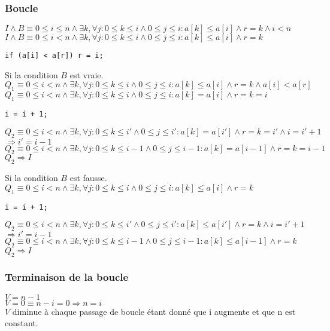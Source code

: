 \documentclass[11pt]{article}
\begin{document}
\subsubsection{Boucle}
$I \land B \equiv 0 \leq i \leq n \land 
	\exists k, \forall j : 0 \leq k \leq i \land 0 \leq j \leq i : a[k] \leq a[i] \land
	r = k \land
	i < n
$\\
$I \land B \equiv 0 \leq i < n \land 
	\exists k, \forall j : 0 \leq k \leq i \land 0 \leq j \leq i : a[k] \leq a[i] \land
	r = k
$
\begin{lstlisting}[style=CStyle]
if (a[i] < a[r]) r = i;
\end{lstlisting}

Si la condition $B$ est vraie.\\
$Q_1 \equiv 0 \leq i < n \land \exists k, \forall j : 0 \leq k \leq i \land 0 \leq j \leq i : a[k] \leq a[i] \land r = k \land a[i] < a[r]$\\
$Q_1 \equiv 0 \leq i < n \land \exists k, \forall j : 0 \leq k \leq i \land 0 \leq j \leq i : a[k] = a[i] \land r = k = i$
\begin{lstlisting}[style=CStyle]
i = i + 1;
\end{lstlisting}
$Q_2 \equiv 0 \leq i < n \land \exists k, \forall j : 0 \leq k \leq i' \land 0 \leq j \leq i' : a[k] = a[i'] \land r = k = i' \land i = i' + 1$\\
$\Rightarrow i' = i - 1$\\
$Q_2 \equiv 0 \leq i < n \land \exists k, \forall j : 0 \leq k \leq i - 1 \land 0 \leq j \leq i - 1 : a[k] = a[i - 1] \land r = k = i - 1$\\
$Q_2 \Rightarrow I$

Si la condition $B$ est fausse.\\
$Q_1 \equiv 0 \leq i < n \land \exists k, \forall j : 0 \leq k \leq i \land 0 \leq j \leq i : a[k] \leq a[i] \land r = k$
\begin{lstlisting}[style=CStyle]
i = i + 1;
\end{lstlisting}
$Q_2 \equiv 0 \leq i < n \land \exists k, \forall j : 0 \leq k \leq i' \land 0 \leq j \leq i' : a[k] \leq a[i'] \land r = k \land i = i' + 1$\\
$\Rightarrow i' = i - 1$\\
$Q_2 \equiv 0 \leq i < n \land \exists k, \forall j : 0 \leq k \leq i - 1 \land 0 \leq j \leq i - 1 : a[k] \leq a[i - 1] \land r = k$\\
$Q_2 \Rightarrow I$

\subsubsection{Terminaison de la boucle}
$V = n - 1$\\
$V = 0 \equiv n - i = 0 \Rightarrow n = i$\\
$V$ diminue à chaque passage de boucle étant donné que i augmente et que n est constant.
\end{document}
